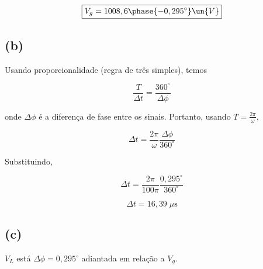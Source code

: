 \[ \boxed{V_g = 1008,6 \phase{-0,295^{\circ}}  \un{V}} \]

\subsection*{(b)}

Usando proporcionalidade (regra de três simples), temos   

\[ \frac{T}{\Delta t} = \frac{360^{\circ}}{\Delta \phi}  \]

onde $\Delta \phi$ é a diferença de fase entre os sinais. Portanto, usando $T = \frac{2\pi}{\omega}$,

\[ \Delta t = \frac{2\pi}{\omega} \frac{\Delta \phi}{360^{\circ}} \]

Substituindo,

\[ \Delta t = \frac{2\pi}{100\pi} \frac{0,295^{\circ}}{360^{\circ}} \]

\[ \boxed{\Delta t = 16,39 \;\mu\textrm{s}} \]

\subsection*{(c)}

$V_L$ está $\Delta \phi = 0,295^{\circ}$ adiantada em relação a $V_g$.









